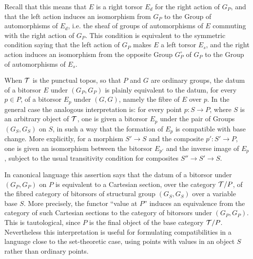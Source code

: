 \documentclass[11pt]{article}
\begin{document}
Recall that this means that \(E\) is a right torsor \(E_d\) for the right action of \(G_P\), and that the left action induces an isomorphism from \(G_P\) to the Group of automorphisms of \(E_d\), i.e. the sheaf of groups of automorphisms of \(E\) commuting with the right action of \(G_P\).  This condition is equivalent to the symmetric condition saying that the left action of \(G_P\) makes \(E\) a left torsor \(E_s\), and the right action induces an isomorphism from the opposite Group \(G_P^\circ\) of \(G_P\) to the Group of automorphisms of \(E_s\).

When \(\mathcal T\) is the punctual topos, so that \(P\) and \(G\) are ordinary groups, the datum of a bitorsor \(E\) under \((G_P,G_P)\) is plainly equivalent to the datum, for every \(p\in P\), of a bitorsor \(E_p\) under \((G,G)\), namely the fibre of \(E\) over \(p\).  In the general case the analogous interpretation is: for every point \(p:S\to P\), where \(S\) is an arbitrary object of \(\mathcal T\), one is given a bitorsor \(E_p\) under the pair of Groups \((G_S,G_S)\) on \(S\), in such a way that the formation of \(E_p\) is compatible with base change.  More explicitly, for a morphism \(S'\to S\) and the composite \(p':S'\to P\), one is given an isomorphism between the bitorsor \(E_{p'}\) and the inverse image of \(E_p\), subject to the usual transitivity condition for composites \(S''\to S'\to S\).

In canonical language this assertion says that the datum of a bitorsor under \((G_P,G_P)\) on \(P\) is equivalent to a Cartesian section, over the category \(\mathcal T/P\), of the fibred category of bitorsors of structural group \((G_S,G_S)\) over a variable base \(S\).  More precisely, the functor ``value at \(P\)'' induces an equivalence from the category of such Cartesian sections to the category of bitorsors under \((G_P,G_P)\).  This is tautological, since \(P\) is the final object of the base category \(\mathcal T/P\).  Nevertheless this interpretation is useful for formulating compatibilities in a language close to the set-theoretic case, using points with values in an object \(S\) rather than ordinary points.
\end{document}
